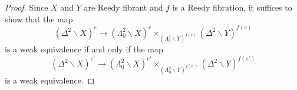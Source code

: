 \documentclass[main.tex]{subfiles}
\begin{document}
\begin{proof}
  Since $X$ and $Y$ are Reedy fibrant and $f$ is a Reedy fibration, it suffices to show that the map
  \begin{equation}
    \label{eq:unprimed_map}
    (\Delta^{2} \backslash X)^{e} \to
    (\Lambda^{2}_{0} \backslash X)^{e}
    \times_{(\Lambda^{2}_{0} \backslash Y)^{f(e)}}
    (\Delta^{2} \backslash Y)^{f(e)}
  \end{equation}
  is a weak equivalence if and only if the map
  \begin{equation}
    \label{eq:primed_map}
    (\Delta^{2} \backslash X)^{e'} \to
    (\Lambda^{2}_{0} \backslash X)^{e'}
    \times_{(\Lambda^{2}_{0} \backslash Y)^{f(e')}}
    (\Delta^{2} \backslash Y)^{f(e')}
  \end{equation}
  is a weak equivalence.


\end{proof}
\end{document}
